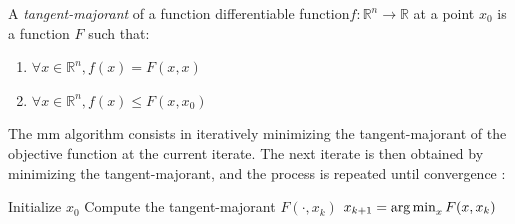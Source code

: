\begin{definition}
    A \textit{tangent-majorant} of a function differentiable function$f : \mathbb{R}^n \to \mathbb{R}$ at a point $x_0$ is a function $F$ such that:
    \begin{enumerate}
        \item $\forall x \in \mathbb{R}^n, f(x) = F(x,x)$
        \item $\forall x \in \mathbb{R}^n, f(x) \leq F(x,x_0)$
    \end{enumerate}
\end{definition}
\noindent The \acrshort{mm} algorithm consists in iteratively minimizing the tangent-majorant of the objective function at the current iterate. The next iterate is then obtained by minimizing the tangent-majorant, and the process is repeated until convergence :
\begin{algorithm}
    \caption{Majorization-Minimization Algorithm}
    \begin{algorithmic}[1]
        \State Initialize $x_0$
            \State Compute the tangent-majorant $F(\cdot, x_k)$
            \State $x_{k+1} = \mathop{\mathrm{arg\,min}}_x F(x, x_k)$
        \EndFor
    \end{algorithmic}
\end{algorithm}


